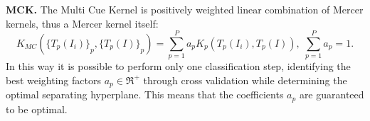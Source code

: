 \vspace{0.5cm}

\noindent\textbf{MCK.} The Multi Cue Kernel is positively
weighted linear combination of Mercer kernels, thus a Mercer kernel itself:
\begin{equation}
K_{MC}({\{T_{p}(I_{i})\}}_{p},{\{T_{p}(I)\}}_{p})=\sum_{p=1}^{P}a_{p}K_{p}(T_{p}(I_{i}),T_{p}(I)),
\; \sum_{p=1}^{P}a_{p}=1.\label{eq:MCK}
\end{equation}
In this way it is possible to perform only one classification
step, identifying the best weighting factors $a_{p}\in \Re^{+}$
through cross validation while
determining the optimal separating hyperplane. This means that the
coefficients $a_{p}$ are guaranteed to be optimal. 


